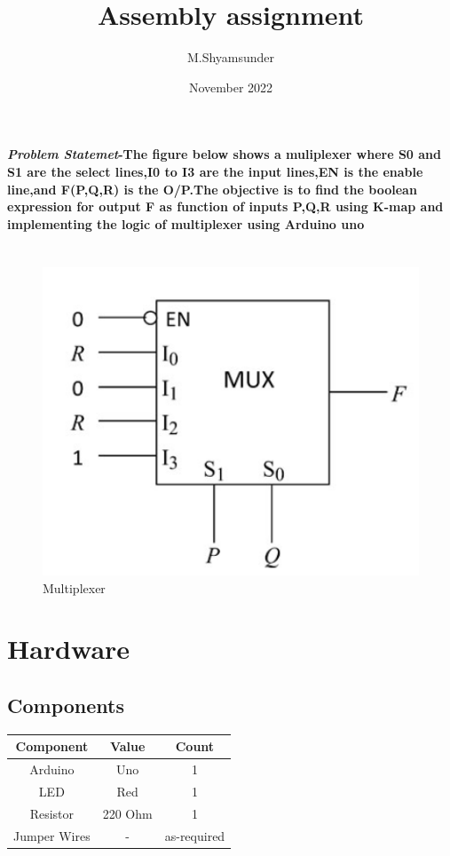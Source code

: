 \documentclass[journal,10pt,twocolumn]{article}
\title{\textbf{Assembly assignment}}
\author{M.Shyamsunder}
\date{November 2022}
\begin{document}
\maketitle
\paragraph{\textit{Problem Statemet}-The figure below shows a muliplexer where S0 and S1 are the select lines,I0 to I3 are the input lines,EN is the enable line,and F(P,Q,R) is the O/P.The objective is to find the boolean expression for output F as function of inputs P,Q,R using K-map and implementing the logic of multiplexer using Arduino uno}

\section*{\normalsize}
\begin{figure}[ht]
\centering
\includegraphics[width=1\columnwidth]{mux.png}
\caption{Multiplexer}
\label{fig:mux}
\end{figure}


\section*{\large Hardware}
\subsection*{\normalsize Components}
{
\centering
\begin{tabular}{|c|c|c|}
\hline
Component&Value&Count\\
\hline
Arduino&Uno&1\\
\hline
LED&Red&1\\
\hline
Resistor&220 Ohm&1\\
\hline
Jumper Wires&-&as-required\\
\hline
\end{tabular}\par
}
\end{document}
